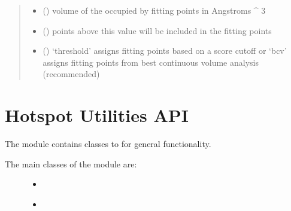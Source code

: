 \documentclass[letterpaper,10pt,english]{sphinxmanual}
\begin{document}
\begin{fulllineitems}
\begin{fulllineitems}
\begin{quote}
\begin{description}
\begin{itemize}
\item {} 
 () \textendash{} volume of the occupied by fitting points in Angstroms \textasciicircum{} 3

\item {} 
 () \textendash{} points above this value will be included in the fitting points

\item {} 
 () \textendash{} ‘threshold’\sphinxhyphen{} assigns fitting points based on a score cutoff or ‘bcv’\sphinxhyphen{} assigns fitting points from best continuous volume analysis (recommended)

\end{itemize}

\end{description}\end{quote}

\end{fulllineitems}


\end{fulllineitems}



\chapter{Hotspot Utilities API}
\label{\detokenize{hs_utilities_api:module-hotspots.hs_utilities}}\label{\detokenize{hs_utilities_api:hotspot-utilities-api}}\label{\detokenize{hs_utilities_api::doc}}
The  module contains classes to for
general functionality.
\begin{description}
\item[{The main classes of the  module are:}] \leavevmode\begin{itemize}
\item {} 
{\hyperref[\detokenize{hs_utilities_api:hotspots.hs_utilities.Helper}]{}}

\item {} 
{\hyperref[\detokenize{hs_utilities_api:hotspots.hs_utilities.Figures}]{}}

\end{itemize}

\end{description}
\end{document}
